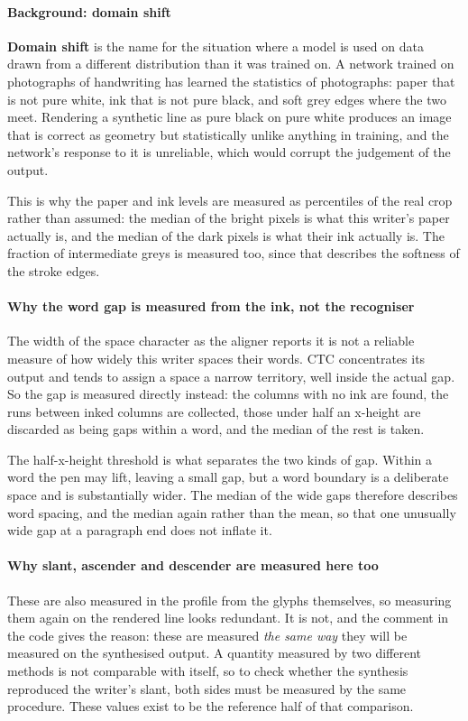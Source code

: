 \paragraph{Background: domain shift}
\textbf{Domain shift} is the name for the situation where a model is used on data drawn from a different distribution than it was trained on. A network trained on photographs of handwriting has learned the statistics of photographs: paper that is not pure white, ink that is not pure black, and soft grey edges where the two meet. Rendering a synthetic line as pure black on pure white produces an image that is correct as geometry but statistically unlike anything in training, and the network's response to it is unreliable, which would corrupt the judgement of the output.

This is why the paper and ink levels are measured as percentiles of the real crop rather than assumed: the median of the bright pixels is what this writer's paper actually is, and the median of the dark pixels is what their ink actually is. The fraction of intermediate greys is measured too, since that describes the softness of the stroke edges.


\paragraph{Why the word gap is measured from the ink, not the recogniser}
The width of the space character as the aligner reports it is not a reliable measure of how widely this writer spaces their words. CTC concentrates its output and tends to assign a space a narrow territory, well inside the actual gap. So the gap is measured directly instead: the columns with no ink are found, the runs between inked columns are collected, those under half an x-height are discarded as being gaps within a word, and the median of the rest is taken.

The half-x-height threshold is what separates the two kinds of gap. Within a word the pen may lift, leaving a small gap, but a word boundary is a deliberate space and is substantially wider. The median of the wide gaps therefore describes word spacing, and the median again rather than the mean, so that one unusually wide gap at a paragraph end does not inflate it.


\paragraph{Why slant, ascender and descender are measured here too}
These are also measured in the profile from the glyphs themselves, so measuring them again on the rendered line looks redundant. It is not, and the comment in the code gives the reason: these are measured \emph{the same way} they will be measured on the synthesised output. A quantity measured by two different methods is not comparable with itself, so to check whether the synthesis reproduced the writer's slant, both sides must be measured by the same procedure. These values exist to be the reference half of that comparison.


